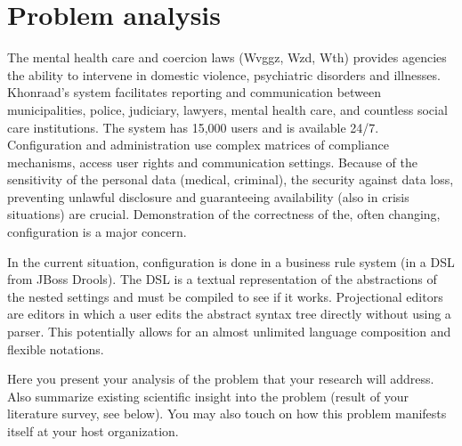\section{Problem analysis}

The mental health care and coercion laws (Wvggz, Wzd, Wth) provides agencies the ability to intervene in domestic violence, psychiatric disorders and illnesses.
Khonraad's system facilitates reporting and communication between municipalities, police, judiciary, lawyers, mental health care, and countless social care institutions.
The system has 15,000 users and is available 24/7. Configuration and administration use complex matrices of compliance mechanisms, access user rights and communication settings.
Because of the sensitivity of the personal data (medical, criminal), the security against data loss, preventing unlawful disclosure and guaranteeing availability (also in crisis situations) are crucial.
Demonstration of the correctness of the, often changing, configuration is a major concern. 

In the current situation, configuration is done in a business rule system (in a DSL from JBoss Drools).
The DSL is a textual representation of the abstractions of the nested settings and must be compiled to see if it works.
Projectional editors are editors in which a user edits the abstract syntax tree directly without using a parser.
This potentially allows for an almost unlimited language composition and flexible notations.




Here you present your analysis of the problem that your research will address. 
Also summarize existing scientific insight into the problem (result of your literature survey, see below). 
You may also touch on how this problem manifests itself at your host organization.
